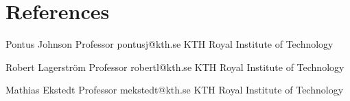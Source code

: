 
\section{References}

    \itemizeCVBegin

            {Pontus Johnson}
            {Professor}
            {pontusj@kth.se}
            {KTH Royal Institute of Technology}

            {Robert Lagerström}
            {Professor}
            {robertl@kth.se}
            {KTH Royal Institute of Technology}

            {Mathias Ekstedt}
            {Professor}
            {mekstedt@kth.se}
            {KTH Royal Institute of Technology}
        
    \itemizeCVEnd
